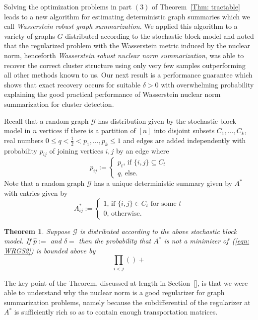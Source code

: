 \documentclass[12pt]{amsart}
\newtheorem{theorem}[lemma]{Theorem}
\theoremstyle{remark}
\newcommand{\grG}{{\mathcal{G}}}
\begin{document}
Solving the optimization problems in part $(3)$ of Theorem~\ref{Thm: tractable} leads to a new algorithm for estimating deterministic graph summaries which we call {\it Wasserstein robust graph summarization}. We applied this algorithm to a variety of graphs $G$ distributed according to the stochastic block model and noted that the regularized problem with the Wasserstein metric induced by the nuclear norm, henceforth {\it Wasserstein robust nuclear norm summarization}, was able to recover the correct cluster structure using only very few samples outperforming all other methods known to us. Our next result is a performance guarantee which shows that exact recovery occurs for suitable $\delta>0$ with overwhelming probability explaining the good practical performance of Wasserstein nuclear norm summarization for cluster detection.

Recall that a random graph $\grG$ has distribution given by the stochastic block model in $n$ vertices if there is a partition of $[n]$ into disjoint subsets $C_1,\dots, C_k$, real numbers $0\leq q<\frac{1}{2}<p_1,\dots, p_k\leq 1$ and edges are added independently with probability $p_{ij}$ of joining vertices $i,j$ by an edge where
\[p_{ij}:=\begin{cases}
p_t\text{, if $\{i,j\}\subseteq C_t$}\\
q\text{, else.}
\end{cases}
\] 
Note that a random graph $\grG$ has a unique deterministic summary given by $A^*$ with entries given by
\[
A^*_{ij}:=\begin{cases}
1\text{, if $\{i,j\}\in C_t$ for some $t$}\\
0\text{, otherwise.}
\end{cases}
\]

\begin{theorem} Suppose $\grG$ is distributed according to the above stochastic block model. If $\hat{p}:=$ and $\delta=$ then the probability that $A^*$ is not a minimizer of~(\ref{eqn: WRGS2}) is bounded above by
\[ \prod_{i<j}\left(\right)+ \] 
\end{theorem}

The key point of the Theorem, discussed at length in Section~\ref{}, is that we were able to understand why the nuclear norm is a good regularizer for graph summarization problems, namely because the subdifferential of the regularizer at $A^*$ is sufficiently rich so as to contain enough transportation matrices. 
\end{document}
